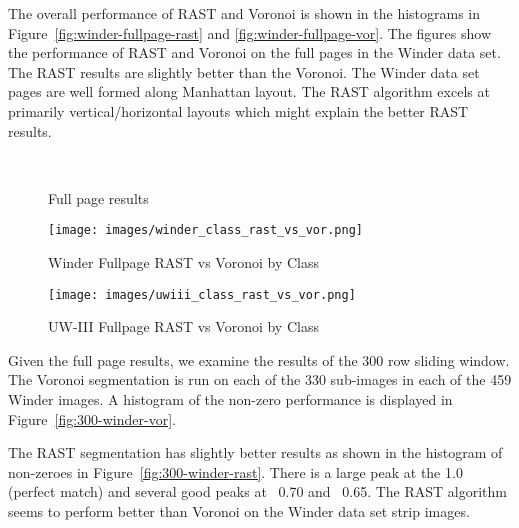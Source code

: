 \documentclass[conference]{IEEEtran}
\begin{document}
The overall performance of RAST and Voronoi is shown in the histograms in
Figure~\ref{fig:winder-fullpage-rast} and \ref{fig:winder-fullpage-vor}. The figures
show the performance of RAST and Voronoi on the full pages in the Winder
data set. The RAST results are slightly better than the Voronoi. The Winder
data set pages are well formed along Manhattan layout. The RAST algorithm
excels at primarily vertical/horizontal layouts which might explain the better
RAST results.

\begin{figure*}
\begin{center}
\caption{Full page results}
\label{fig:fullpage-results}
 {
  \\
 }
\end{center}
\end{figure*}


\begin{figure}[winder-class-rast-vs-vor]
\caption{Winder Fullpage RAST vs Voronoi by Class}
\begin{center}
\texttt{[image: images/winder\_class\_rast\_vs\_vor.png]}
\label{fig:winder-class-rast-vs-vor}
\end{center}
\end{figure}

\begin{figure}[uwiii-class-rast-vs-vor]
\caption{UW-III Fullpage RAST vs Voronoi by Class}
\begin{center}
\texttt{[image: images/uwiii\_class\_rast\_vs\_vor.png]}
\label{fig:uwiii-class-rast-vs-vor}
\end{center}
\end{figure}

Given the full page results, we examine the results of the 300 row sliding
window. The Voronoi segmentation is run on each of the 330 sub-images in each of
the 459 Winder images. A histogram of the non-zero performance is displayed in
Figure~\ref{fig:300-winder-vor}. 

The RAST segmentation has slightly better results as shown in the histogram of
non-zeroes in Figure~\ref{fig:300-winder-rast}. There is a large peak at the
1.0 (perfect match) and several good peaks at ~0.70 and ~0.65. The RAST
algorithm seems to perform better than Voronoi on the Winder data set strip
images. 
\end{document}
